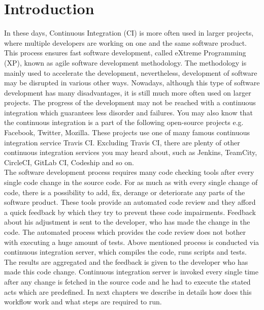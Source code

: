 \newtheorem{DEF}{Definition}

\chapter{Introduction}

In these days, Continuous Integration (CI) is more often used in larger projects, where multiple developers are working on one and the same software product. This process ensures fast software development, called eXtreme Programming (XP), known as agile software development methodology. The methodology is mainly used to accelerate the development, nevertheless, development of software may be disrupted in various other ways. Nowadays, although this type of software development has many disadvantages, it is still much more often used on larger projects. The progress of the development may not be reached with a continuous integration which guarantees less disorder and failures. You may also know that the continuous integration is a part of the following open-source projects e.g. Facebook, Twitter, Mozilla. These projects use one of many famous continuous integration service Travis CI. Excluding Travis CI, there are plenty of other continuous integration services you may heard about, such as Jenkins, TeamCity, CircleCI, GitLab CI, Codeship and so on.\\

The software development process requires many code checking tools after every single code change in the source code. For as much as with every single change of code, there is a possibility to add, fix, derange or deteriorate any parts of the software product. These tools provide an automated code review and they afford a quick feedback by which they try to prevent these code impairments. Feedback about his adjustment is sent to the developer, who has made the change in the code. The automated process which provides the code review does not bother with executing a huge amount of tests. Above mentioned process is conducted via continuous integration server, which compiles the code, runs scripts and tests. The results are aggregated and the feedback is given to the developer who has made this code change. Continuous integration server is invoked every single time after any change is fetched in the source code and he had to execute the stated acts which are predefined. In next chapters we describe in details how does this workflow work and what steps are required to run.\\

